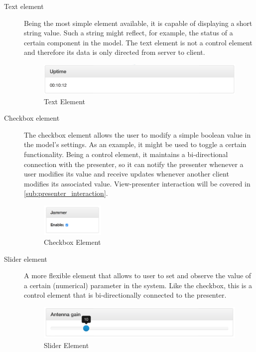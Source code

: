 \documentclass[a4paper, openany, oneside]{memoir}
\begin{document}
\begin{description}
	\item[Text element]
        Being the most simple element available, it is capable of displaying a short string value. Such a string might reflect, for example, the status of a certain component in the model. The text element is not a control element and therefore its data is only directed from server to client.

\begin{figure}[H]
    \centering
    \includegraphics[width=\textwidth]{figures/text.png}
    \caption{Text Element}
    \label{fig:text_element}
\end{figure}

	\item[Checkbox element]
        The checkbox element allows the user to modify a simple boolean value in the model's settings. As an example, it might be used to toggle a certain functionality. Being a control element, it maintains a bi-directional connection with the presenter, so it can notify the presenter whenever a user modifies its value and receive updates whenever another client modifies its associated value. View-presenter interaction will be covered in \cref{sub:presenter_interaction}.

\begin{figure}[H]
  \centering
    \includegraphics[width=0.3\textwidth]{figures/checkbox.png}
    \caption{Checkbox Element}
    \label{fig:checkbox_element}
\end{figure}

	\item[Slider element]
	A more flexible element that allows to user to set and observe the value of a certain (numerical) parameter in the system. Like the checkbox, this is a control element that is bi-directionally connected to the presenter.

\begin{figure}[H]
    \centering
    \includegraphics[width=\textwidth]{figures/slider.png}
    \caption{Slider Element}
    \label{fig:slider_element}
\end{figure}


\end{description}
\end{document}
